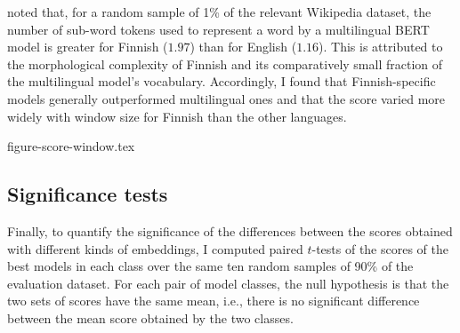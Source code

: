 \textcite[3]{Virtanen2019} noted that, for a random sample of 1\% of the relevant
Wikipedia dataset, the number of sub-word tokens used to represent a word by a
multilingual BERT model is greater for Finnish ($1.97$) than for English ($1.16$).
This is attributed to the morphological complexity of Finnish and its comparatively
small fraction of the multilingual model's vocabulary.
Accordingly, I found that Finnish-specific models generally outperformed multilingual
ones and that the score varied more widely with window size for Finnish than the other
languages.

{figure-score-window.tex}

\subsection{Significance tests}
\label{sec:significance}

Finally, to quantify the significance of the differences between the scores obtained
with different kinds of embeddings, I computed paired $t$-tests of the scores of the
best models in each class over the same ten random samples of 90\% of the evaluation
dataset.
For each pair of model classes, the null hypothesis is that the two sets of scores have
the same mean, i.e., there is no significant difference between the mean score obtained
by the two classes.
\\
